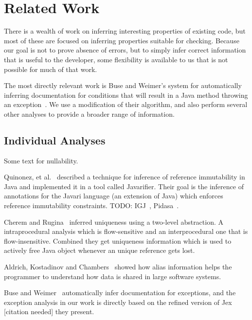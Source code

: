 \section{Related Work}
There is a wealth of work on inferring interesting properties of existing code,
but most of these are focused on inferring properties suitable for checking.
Because our goal is not to prove absence of errors, but to simply infer correct
information that is useful to the developer, some flexibility is available to us
that is not possible for much of that work.

The most directly relevant work is Buse and Weimer's system for automatically
inferring documentation for conditions that will result in a Java method
throwing an exception~\cite{autodoc}.  We use a modification of their
algorithm, and also perform several other analyses to provide a broader range
of information.

\subsection{Individual Analyses}
Some text for nullability.

Quinonez, et al.~\cite{Javarifier} described a technique for inference of
reference immutability in Java and implemented it in a tool called {\sc
  Javarifier}. Their goal is the inference of annotations for the {\sc Javari}
language (an extension of Java) which enforces reference immutability
constraints. TODO: IGJ~\cite{IGJ}, Pidasa~\cite{Pidasa}.

Cherem and Rugina~\cite{UniquenessInference} inferred uniqueness using a two-level
abstraction. A intraprocedural analysis which is flow-sensitive and an interprocedural
one that is flow-insensitive. Combined they get uniqueness information
which is used to actively free Java object whenever an unique reference gets lost.

Aldrich, Kostadinov and Chambers~\cite{AliasJava} showed how alias information 
helps the programmer to understand how data is shared in large software systems.

Buse and Weimer~\cite{autodoc} automatically infer documentation for
exceptions, and the exception analysis in our work is directly based on the
refined version of {\sc Jex} [citation needed] they present.
